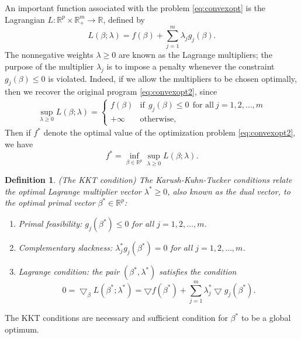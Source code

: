 \documentclass[a4paper,12pt,openany]{report}
\theoremstyle{plain}
\theoremstyle{plain}
\theoremstyle{plain}
\theoremstyle{plain}
\theoremstyle{plain}
\theoremstyle{plain}
\theoremstyle{plain}
\newtheorem{definition}{\textbf{Definition}}[section]
\theoremstyle{plain}
\theoremstyle{plain}
\theoremstyle{plain}
\theoremstyle{plain}
\theoremstyle{plain}
\begin{document}
An important function associated with the problem \eqref{eq:convexopt} is the Lagrangian $L : \mathbb{R}^p\times\mathbb{R}_+^m\to\mathbb{R}$, defined by
\begin{equation}
L(\beta;\lambda) = f(\beta)+\sum_{j=1}^{m}\lambda_jg_j(\beta).
\end{equation}
The nonnegative weights $\lambda\geq 0$ are known as the Lagrange multipliers; the purpose of the multiplier $\lambda_j$ is to impose a penalty whenever the constraint $g_j(\beta) \leq 0$ is violated. Indeed, if we allow the multipliers to be chosen optimally, then we recover the original program \eqref{eq:convexopt2}, since
\begin{eqnarray}
\underset{\lambda\geq 0}{\sup}L(\beta;\lambda) = \left\lbrace\begin{array}{ll}
f(\beta) & \text{if}\ \ g_j(\beta)\leq 0 \ \ \text{for all} \ j=1,2,\ldots,m\\
+\infty & \text{otherwise},
\end{array}\right.
\end{eqnarray}
Then if $f^*$ denote the optimal value of the optimization problem \eqref{eq:convexopt2}, we have
\begin{equation}
 f^*=\underset{\beta\in\mathbb{R}^p}{\inf}\underset{\lambda\geq 0}{\sup}L(\beta;\lambda).
\end{equation}
\begin{definition}{(The KKT condition)}
	The Karush-Kuhn-Tucker conditions relate the optimal Lagrange multiplier vector $\lambda^*\geq 0$, also known as the dual vector, to the optimal primal vector $\beta^*\in\mathbb{R}^p$:
	\begin{enumerate}
		\item \textit{Primal feasibility}: $g_j(\beta^*)\leq 0$ for all $j=1,2,\ldots,m$.
		\item \textit{Complementary slackness}: $\lambda_j^*g_j(\beta^*) =0$ for all $j=1,2,\ldots,m$.
		\item \textit{Lagrange condition}: the pair $(\beta^*,\lambda^*)$ satisfies the condition
		\begin{equation}\label{eq:Lagrange}
		0=\bigtriangledown_{\beta}L(\beta^*;\lambda^*) = \bigtriangledown f(\beta^*)+\sum_{j=1}^{m}\lambda_j^*\bigtriangledown g_j(\beta^*).
		\end{equation}
	\end{enumerate}
\end{definition}
The KKT conditions are necessary and sufficient condition for $\beta^*$ to be a global optimum.
\end{document}
